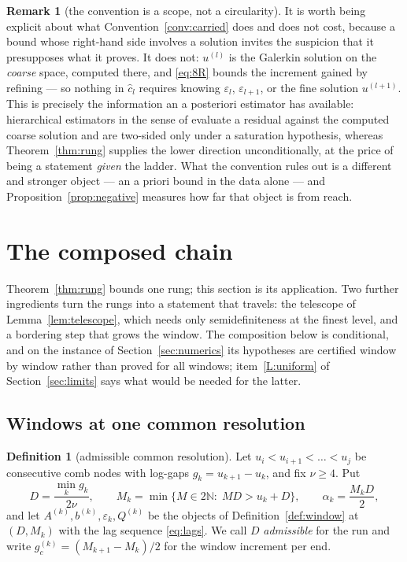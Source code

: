 \documentclass[11pt,a4paper]{article}
\theoremstyle{plain}
\theoremstyle{definition}
\newtheorem{definition}[theorem]{Definition}
\newtheorem{remark}[theorem]{Remark}
\newcommand{\N}{\mathbb{N}}
\begin{document}
\begin{remark}[the convention is a scope, not a circularity]
\label{rem:scope}
It is worth being explicit about what Convention~\ref{conv:carried} does and does not
cost, because a bound whose right-hand side involves a solution invites the suspicion
that it presupposes what it proves. It does not: $u^{(l)}$ is the Galerkin solution on
the \emph{coarse} space, computed there, and \eqref{eq:8R} bounds the increment gained
by refining --- so nothing in $\widehat c_{l}$ requires knowing $\varepsilon_{l}$,
$\varepsilon_{l+1}$, or the fine solution $u^{(l+1)}$. This is precisely the
information an a posteriori estimator has available: hierarchical estimators in the
sense of \cite{BankSmith1993,BornemannErdmannKornhuber1996,DorflerNochetto2002}
evaluate a residual against the computed coarse solution and are two-sided only under
a saturation hypothesis, whereas Theorem~\ref{thm:rung} supplies the lower direction
unconditionally, at the price of being a statement \emph{given} the ladder. What the
convention rules out is a different and stronger object --- an a priori bound in the
data alone --- and Proposition~\ref{prop:negative} measures how far that object is
from reach.
\end{remark}

\section{The composed chain}
\label{sec:chain}

Theorem~\ref{thm:rung} bounds one rung; this section is its application. Two further
ingredients turn the rungs into a statement that travels: the telescope of
Lemma~\ref{lem:telescope}, which needs only semidefiniteness at the finest level, and
a bordering step that grows the window. The composition below is conditional, and on
the instance of Section~\ref{sec:numerics} its hypotheses are certified window by
window rather than proved for all windows; item~\ref{L:uniform} of
Section~\ref{sec:limits} says what would be needed for the latter.

\subsection{Windows at one common resolution}

\begin{definition}[admissible common resolution]
\label{def:admissible}
Let $u_{i}<u_{i+1}<\dots<u_{j}$ be consecutive comb nodes with log-gaps
$g_{k}=u_{k+1}-u_{k}$, and fix $\nu\ge4$. Put
\begin{equation}
\label{eq:D}
  D=\frac{\min_{k}g_{k}}{2\nu},
  \qquad
  M_{k}=\min\bigl\{M\in2\N:\;MD>u_{k}+D\bigr\},
  \qquad
  \alpha_{k}=\frac{M_{k}D}{2},
\end{equation}
and let $A^{(k)},b^{(k)},\varepsilon_{k},Q^{(k)}$ be the objects of
Definition~\ref{def:window} at $(D,M_{k})$ with the lag sequence \eqref{eq:lags}.
We call $D$ \emph{admissible} for the run and write $g_{c}^{(k)}=(M_{k+1}-M_{k})/2$
for the window increment per end.
\end{definition}
\end{document}
